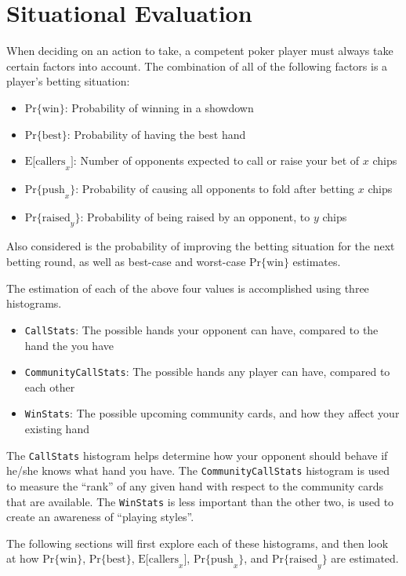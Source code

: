 


\chapter{Situational Evaluation}
\label{sec:SituationalEvaluation}

When deciding on an action to take, a competent poker player must always take certain factors into account.
The combination of all of the following factors is a player's betting situation:
\begin{itemize}
\singlespacing
\item $\mathrm{Pr\{win\}}$: Probability of winning in a showdown
\item $\mathrm{Pr\{best\}}$: Probability of having the best hand
\item $\mathrm{E[callers}_x]$: Number of opponents expected to call or raise your bet of $x$ chips
\item $\mathrm{Pr\{push}_x\}$: Probability of causing all opponents to fold after betting $x$ chips
\item $\mathrm{Pr\{raised}_y\}$: Probability of being raised by an opponent, to $y$ chips
\end{itemize}
Also considered is the probability of improving the betting situation for the next betting round, as well as best-case and worst-case $\mathrm{Pr\{win\}}$ estimates.

The estimation of each of the above four values is accomplished using three histograms.
\begin{itemize}
\singlespacing
\item \texttt{CallStats}: The possible hands your opponent can have, compared to the hand the you have
\item \texttt{CommunityCallStats}: The possible hands any player can have, compared to each other
\item \texttt{WinStats}: The possible upcoming community cards, and how they affect your existing hand
\end{itemize}
The \texttt{CallStats} histogram helps determine how your opponent should behave if he/she knows what hand you have.
The \texttt{CommunityCallStats} histogram is used to measure the ``rank'' of any given hand with respect to the community cards that are available.
The \texttt{WinStats} is less important than the other two, is used to create an awareness of ``playing styles''.

The following sections will first explore each of these histograms, and then look at how $\mathrm{Pr\{win\}}$, $\mathrm{Pr\{best\}}$, $\mathrm{E[callers}_x]$, $\mathrm{Pr\{push}_x\}$, and $\mathrm{Pr\{raised}_y\}$ are estimated.

